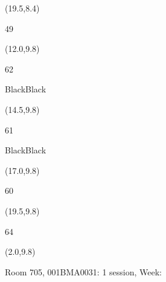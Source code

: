 \documentclass[a4paper]{article}
\newcommand{\myseat}[4]{%
\vspace{-0.1cm} \hspace{-0.5cm}
\parbox[t][2.2cm][t]{3.5cm}{%
\small #1 %
\begin{description}
\vspace{-0.1cm}
\item [ID:] #2
\vspace{-0.1cm}
\item [Team:] #3 \normalsize
\vspace{-0.1cm}
\item \normalsize #4
\vspace{-0.1cm}
\end{description}
}
}
\begin{document}
\begin{textblock}{2.5}(19.5,8.4)
\textblockcolor{}
\myseat{49}{}{}{}
\end{textblock}


\begin{textblock}{2.5}(12.0,9.8)
\myseat{62}{}{BlackBlack}{}
\end{textblock}

\begin{textblock}{2.5}(14.5,9.8)
\myseat{61}{}{BlackBlack}{}
\end{textblock}

\begin{textblock}{2.5}(17.0,9.8)
\textblockcolor{}
\myseat{60}{}{}{}
\end{textblock}

\begin{textblock}{2.5}(19.5,9.8)
\textblockcolor{}
\myseat{64}{}{}{}
\end{textblock}

\begin{textblock}{10}(2.0,9.8)
\textblockcolor{}
\parbox[t][2.2cm][t]{9.5cm}{%
\large Room 705, 001BMA0031: 1 session, Week: 
\vspace{-0.3cm} \hspace{-0.5cm}
}
\end{textblock}
\end{document}
